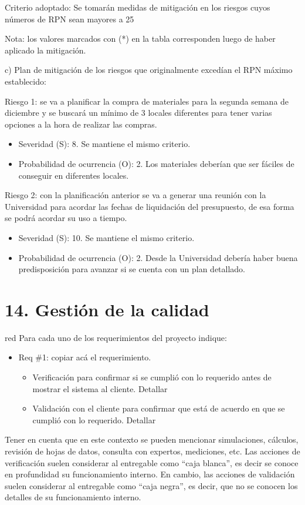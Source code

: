\documentclass[
11pt, %
codirector, %
]{charter}
\begin{document}
Criterio adoptado: 
Se tomarán medidas de mitigación en los riesgos cuyos números de RPN sean mayores a 25

Nota: los valores marcados con (*) en la tabla corresponden luego de haber aplicado la mitigación.

c) Plan de mitigación de los riesgos que originalmente excedían el RPN máximo establecido:
 
Riesgo 1: se va a planificar la compra de materiales para la segunda semana de diciembre y se buscará un mínimo de 3 locales diferentes para tener varias opciones a la hora de realizar las compras.
\begin{itemize}
	\item Severidad (S): 8. Se mantiene el mismo criterio.
	\item Probabilidad de ocurrencia (O): 2. Los materiales deberían que ser fáciles de conseguir en diferentes locales.
\end{itemize}
Riesgo 2: con la planificación anterior se va a generar una reunión con la Universidad para acordar las fechas de liquidación del presupuesto, de esa forma se podrá acordar su uso a tiempo.
\begin{itemize}
	\item Severidad (S): 10. Se mantiene el mismo criterio.
	\item Probabilidad de ocurrencia (O): 2. Desde la Universidad debería haber buena predisposición para avanzar si se cuenta con un plan detallado.
\end{itemize}

\section{14. Gestión de la calidad}
\label{sec:calidad}

\begin{consigna}{red}
Para cada uno de los requerimientos del proyecto indique:
\begin{itemize} 
\item Req \#1: copiar acá el requerimiento.

\begin{itemize}
	\item Verificación para confirmar si se cumplió con lo requerido antes de mostrar el sistema al cliente. Detallar 
	\item Validación con el cliente para confirmar que está de acuerdo en que se cumplió con lo requerido. Detallar  
\end{itemize}

\end{itemize}

Tener en cuenta que en este contexto se pueden mencionar simulaciones, cálculos, revisión de hojas de datos, consulta con expertos, mediciones, etc.  Las acciones de verificación suelen considerar al entregable como ``caja blanca'', es decir se conoce en profundidad su funcionamiento interno.  En cambio, las acciones de validación suelen considerar al entregable como ``caja negra'', es decir, que no se conocen los detalles de su funcionamiento interno.

\end{consigna}
\end{document}
